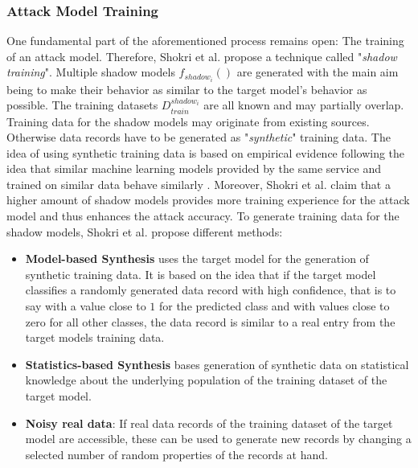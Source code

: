 \documentclass[runningheads]{llncs}
\begin{document}
\subsubsection{Attack Model Training}

One fundamental part of the aforementioned process remains open: The training of an attack model. Therefore, Shokri et al. \cite{shokri2017membership} propose a technique called "\textit{shadow training}". Multiple shadow models $f_{shadow_{i}}()$ are generated with the main aim being to make their behavior as similar to the target model's behavior as possible. The training datasets $D_{train}^{shadow_{i}}$ are all known and may partially overlap. Training data for the shadow models may originate from existing sources. Otherwise data records have to be generated as "\textit{synthetic}" training data. The idea of using synthetic training data is based on empirical evidence following the idea that similar machine learning models provided by the same service and trained on similar data behave similarly \cite{shokri2017membership}. Moreover, Shokri et al. claim that a higher amount of shadow models provides more training experience for the attack model and thus enhances the attack accuracy.
To generate training data for the shadow models, Shokri et al. \cite{shokri2017membership} propose different methods:

\begin{itemize}
    \item \textbf{Model-based Synthesis} uses the target model for the generation of synthetic training data. It is based on the idea that if the target model classifies a randomly generated data record with high confidence, that is to say with a value close to $1$ for the predicted class and with values close to zero for all other classes, the data record is similar to a real entry from the target models training data.
    \item \textbf{Statistics-based Synthesis} bases generation of synthetic data on statistical knowledge about the underlying population of the training dataset of the target model.
    \item \textbf{Noisy real data}: If real data records of the training dataset of the target model are accessible, these can be used to generate new records by changing a selected number of random properties of the records at hand.
\end{itemize}
\end{document}
